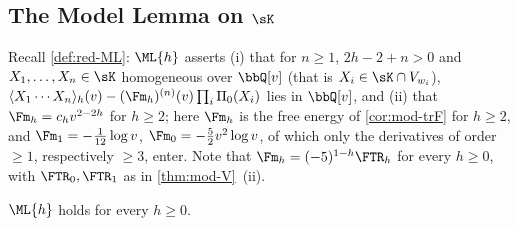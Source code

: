 \subsection{The Model Lemma on \texorpdfstring{$\sK$}{K}}
\label{sec:mod-MLK}

Recall \cref{def:red-ML}: $\ML{h}$ asserts (i) that for $n\geq 1$, $2h-2+n>0$ and $X_1,\dots,X_n\in\sK$ homogeneous over $\bbQ[v]$ (that is $X_i\in\sK\cap V_{w_i}$), $\langle X_1\cdots X_n\rangle_h(v)-(\Fm_h)^{(n)}(v)\prod_i\Pi_0(X_i)$ lies in $\bbQ[v]$, and (ii) that $\Fm_h=c_hv^{2-2h}$ for $h\geq 2$; here $\Fm_h$ is the free energy of \cref{cor:mod-trF} for $h\geq 2$, and $\Fm_1=-\frac1{12}\log v$, $\Fm_0=-\frac52v^2\log v$, of which only the derivatives of order $\geq 1$, respectively $\geq 3$, enter. Note that $\Fm_h=(-5)^{1-h}\FTR_h$ for every $h\geq 0$, with $\FTR_0,\FTR_1$ as in \cref{thm:mod-V}~(ii).

\begin{thm}
\label{thm:mod-MLK}
$\ML{h}$ holds for every $h\geq 0$.
\end{thm}

